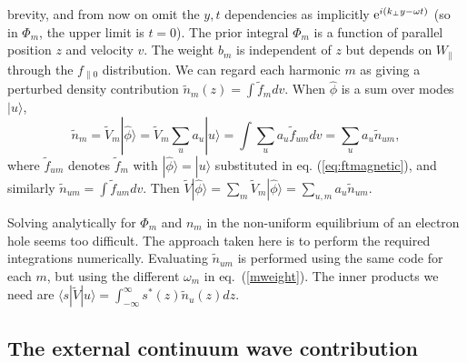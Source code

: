 \documentclass[12pt]{article}
\def\ket#1{|#1\rangle}
\def\bra#1{\langle#1}
\begin{document}
brevity, and from now on omit the $y,t$ dependencies as implicitly
$ {\rm e}^{i(k_\perp y-\omega t)}$ (so in $\Phi_m$, the upper limit is
$t=0$). The prior integral $\Phi_m$ is a function of parallel position
$z$ and velocity $v$. The weight $b_m$ is independent of $z$ but
depends on $W_\parallel$ through the $f_{\parallel0}$ distribution.
We can regard each harmonic $m$ as giving a perturbed density
contribution $\tilde n_m(z)=\int \tilde f_m dv$. When $\hat\phi$ is a
sum over modes $\ket{u}$,
\begin{equation}
  \label{eq:13}
\tilde  n_m=\tilde{V}_{m}\ket{\hat\phi}=\tilde{V}_{m}\sum_u a_u\ket{u}=\int \sum_u a_u
  \tilde f_{um} dv=\sum_u a_u \tilde n_{um},
\end{equation}
where $\tilde f_{um}$ denotes $\tilde f_m$ with
$\ket{\hat\phi}=\ket{u}$ substituted in eq. (\ref{eq:ftmagnetic}), and
similarly $\tilde n_{um}=\int \tilde f_{um}dv$. Then
$\tilde V \ket{\hat\phi}=\sum_m\tilde
V_m\ket{\hat\phi}=\sum_{u,m}a_u\tilde n_{um}$.

Solving analytically for $\Phi_m$ and $n_m$ in the non-uniform
equilibrium of an electron hole seems too difficult. The approach
taken here is to perform the required integrations numerically.
 Evaluating $\tilde
n_{um}$ is performed using the same code for each $m$, but using the
different $\omega_m$ in eq.\ (\ref{mweight}). The inner products
we need are $\bra{s}|\tilde V\ket{u}=\int_{-\infty}^\infty s^*(z)\tilde
n_{u}(z) dz$.

\subsection{The external continuum wave contribution}
\end{document}
